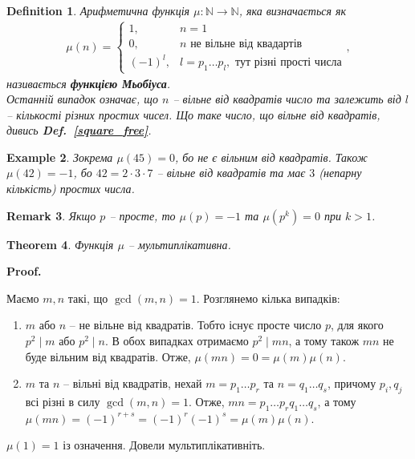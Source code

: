 \documentclass[a4paper, 10pt]{article}
\makeatletter
\theoremstyle{theoremdd}
\newtheorem{theorem}{Theorem}[subsection]
\theoremstyle{theoremdd}
\newtheorem{definition}[theorem]{Definition}
\theoremstyle{theoremdd}
\theoremstyle{theoremdd}
\newtheorem{example}[theorem]{Example}
\theoremstyle{theoremdd}
\theoremstyle{theoremdd}
\newtheorem{remark}[theorem]{Remark}
\theoremstyle{theoremdd}
\theoremstyle{theoremdd}
\renewenvironment{proof}[1][Proof.\\]{\par
\pushQED{\hfill \qed}%
\normalfont \topsep6\p@\@plus6\p@\relax
\trivlist
\item\relax
{\bfseries
#1\@addpunct{.}}\hspace\labelsep\ignorespaces
}{%
\popQED\endtrivlist\@endpefalse
}
\newcommand\defref[1]{\textbf{Def.~\ref{#1}}}
\makeatother
\begin{document}
\begin{definition}
Арифметична функція $\mu \colon \mathbb{N} \to \mathbb{N}$, яка визначається як
\begin{align*}
\mu(n) = \begin{cases} 1,& n = 1 \\ 0, & n \text{ не вільне від квадартів} \\ (-1)^l, & l = p_1 \dots p_l, \text{ тут різні прості числа} \end{cases},
\end{align*}
називається \textbf{функцією Мьобіуса}.\\
Останній випадок означає, що $n$ -- вільне від квадратів число та залежить від $l$ -- кількості різних простих чисел. Що таке число, що вільне від квадратів, дивись \defref{square_free}.
\end{definition}

\begin{example}
Зокрема $\mu(45) = 0$, бо не є вільним від квадратів. Також $\mu(42) = - 1$, бо $42 = 2 \cdot 3 \cdot 7$ -- вільне від квадратів та має $3$ (непарну кількість) простих числа.
\end{example}

\begin{remark}
Якщо $p$ -- просте, то $\mu(p) = -1$ та $\mu(p^k) = 0$ при $k > 1$.
\end{remark}

\begin{theorem}
Функція $\mu$ -- мультиплікативна.
\end{theorem}

\begin{proof}
Маємо $m,n$ такі, що $\gcd(m,n) = 1$. Розглянемо кілька випадків:
\begin{enumerate}[nosep,wide=0pt,label={\Roman*.}]
\item $m$ або $n$ -- не вільне від квадратів. Тобто існує просте число $p$, для якого $p^2 \mid m$ або $p^2 \mid n$. В обох випадках отримаємо $p^2 \mid mn$, а тому також $mn$ не буде вільним від квадратів. Отже, $\mu(mn) = 0 = \mu(m)\mu(n)$.
\item $m$ та $n$ -- вільні від квадратів, нехай $m = p_1 \dots p_r$ та $n = q_1 \dots q_s$, причому $p_i,q_j$ всі різні в силу $\gcd(m,n) = 1$. Отже, $mn = p_1 \dots p_r q_1 \dots q_s$, а тому $\mu(mn) = (-1)^{r+s} = (-1)^r (-1)^s = \mu(m)\mu(n)$.
\end{enumerate}
$\mu(1) = 1$ із означення. Довели мультиплікативніть.
\end{proof}
\end{document}
